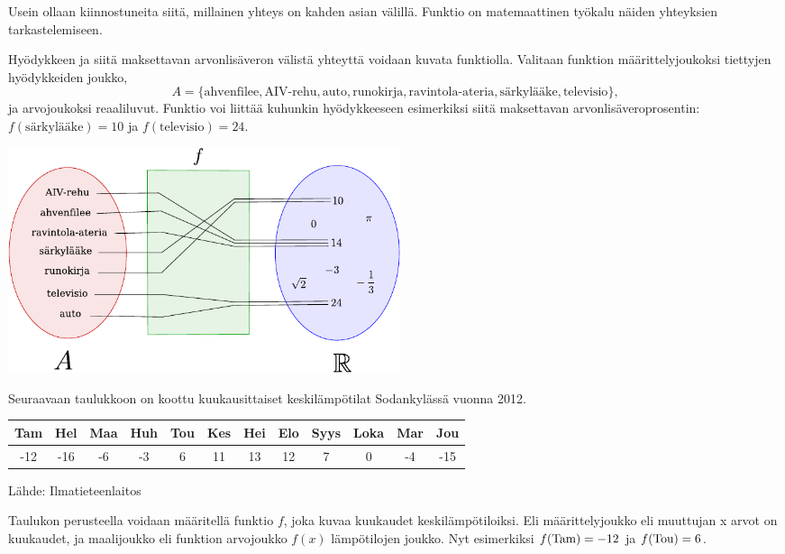 Usein ollaan kiinnostuneita siitä, millainen yhteys on kahden asian välillä.
Funktio on matemaattinen työkalu näiden yhteyksien tarkastelemiseen.


\begin{esimerkki}
	Hyödykkeen ja siitä maksettavan arvonlisäveron välistä yhteyttä voidaan kuvata funktiolla.
	Valitaan funktion määrittelyjoukoksi tiettyjen hyödykkeiden joukko,
		\[ A = \{\text{ahvenfilee}, \text{AIV-rehu}, \text{auto}, \text{runokirja},
		\text{ravintola-ateria}, \text{särkylääke}, \text{televisio}\}, \]
	ja arvojoukoksi reaaliluvut.
	Funktio voi liittää kuhunkin hyödykkeeseen esimerkiksi siitä maksettavan arvonlisäveroprosentin:
	$f(\text{särkylääke}) = 10$ ja $f(\text{televisio}) = 24$.

	\begin{center}
		\includegraphics[width=11.5cm]{pictures/funktiokone.pdf}
	\end{center}
\end{esimerkki}


\begin{esimerkki}
Seuraavaan taulukkoon on koottu kuukausittaiset keskilämpötilat Sodankylässä vuonna 2012.

	\begin{tabular}{|c|c|c|c|c|c|c|c|c|c|c|c|}
	\hline
	Tam & Hel & Maa & Huh & Tou & Kes & Hei & Elo & Syys & Loka & Mar & Jou\\
	\hline
	-12 & -16 & -6 & -3 & 6 & 11 & 13 & 12 & 7 & 0 & -4 & -15\\
	\hline
	\end{tabular}
Lähde: Ilmatieteenlaitos

Taulukon perusteella voidaan määritellä funktio $f$, joka kuvaa kuukaudet keskilämpötiloiksi. Eli määrittelyjoukko eli muuttujan x arvot on kuukaudet, ja maalijoukko eli funktion arvojoukko \(f(x)\) lämpötilojen joukko. Nyt esimerkiksi \(f($Tam$)=-12\) ja \(f($Tou$) = 6\). 
\end{esimerkki}

